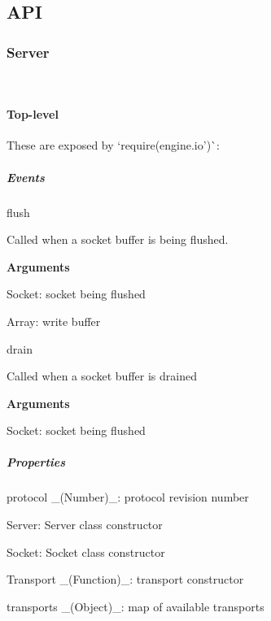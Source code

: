 \subsection*{A\+PI}

\subsubsection*{Server}



~\newline


\paragraph*{Top-\/level}

These are exposed by `require(\textquotesingle{}engine.\+io')\`{}\+:

\subparagraph*{Events}


\begin{DoxyItemize}
\item {\ttfamily flush}
\begin{DoxyItemize}
\item Called when a socket buffer is being flushed.
\item {\bfseries Arguments}
\begin{DoxyItemize}
\item {\ttfamily Socket}\+: socket being flushed
\item {\ttfamily Array}\+: write buffer
\end{DoxyItemize}
\end{DoxyItemize}
\item {\ttfamily drain}
\begin{DoxyItemize}
\item Called when a socket buffer is drained
\item {\bfseries Arguments}
\begin{DoxyItemize}
\item {\ttfamily Socket}\+: socket being flushed
\end{DoxyItemize}
\end{DoxyItemize}
\end{DoxyItemize}

\subparagraph*{Properties}


\begin{DoxyItemize}
\item {\ttfamily protocol} \+\_\+(\+Number)\+\_\+\+: protocol revision number
\item {\ttfamily Server}\+: Server class constructor
\item {\ttfamily Socket}\+: Socket class constructor
\item {\ttfamily Transport} \+\_\+(\+Function)\+\_\+\+: transport constructor
\item {\ttfamily transports} \+\_\+(\+Object)\+\_\+\+: map of available transports
\end{DoxyItemize}

